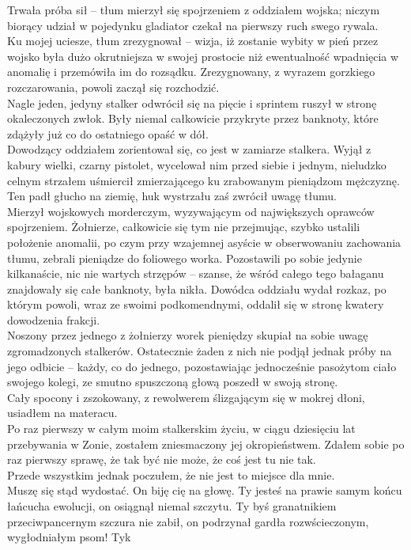 \documentclass[../MAIN.tex]{subfiles}
\begin{document}
Trwała próba sił -- tłum mierzył się spojrzeniem z oddziałem wojska; niczym biorący udział w pojedynku gladiator czekał na pierwszy ruch swego rywala.\\
Ku mojej uciesze, tłum zrezygnował -- wizja, iż zostanie wybity w pień przez wojsko była dużo okrutniejsza w swojej prostocie niż ewentualność wpadnięcia w anomalię i przemówiła im do rozsądku. Zrezygnowany, z wyrazem gorzkiego rozczarowania, powoli zaczął się rozchodzić.\\
Nagle jeden, jedyny stalker odwrócił się na pięcie i sprintem ruszył w stronę okaleczonych zwłok. Były niemal całkowicie przykryte przez banknoty, które zdążyły już co do ostatniego opaść w dół.\\
Dowodzący oddziałem zorientował się, co jest w zamiarze stalkera. Wyjął z kabury wielki, czarny pistolet, wycelował nim przed siebie i jednym, nieludzko celnym strzałem uśmiercił zmierzającego ku zrabowanym pieniądzom mężczyznę. Ten padł głucho na ziemię, huk wystrzału zaś zwrócił uwagę tłumu.\\
Mierzył wojskowych morderczym, wyzywającym od największych oprawców spojrzeniem. Żołnierze, całkowicie się tym nie przejmując, szybko ustalili położenie anomalii, po czym przy wzajemnej asyście w obserwowaniu zachowania tłumu, zebrali pieniądze do foliowego worka. Pozostawili po sobie jedynie kilkanaście, nic nie wartych strzępów -- szanse, że wśród całego tego bałaganu znajdowały się całe banknoty, była nikła. Dowódca oddziału wydał rozkaz, po którym powoli, wraz ze swoimi podkomendnymi, oddalił się w stronę kwatery dowodzenia frakcji.\\
Noszony przez jednego z żołnierzy worek pieniędzy skupiał na sobie uwagę zgromadzonych stalkerów. Ostatecznie żaden z nich nie podjął jednak próby na jego odbicie -- każdy, co do jednego, pozostawiając jednocześnie pasożytom ciało swojego kolegi, ze smutno spuszczoną głową poszedł w swoją stronę.\\
Cały spocony i zszokowany, z rewolwerem ślizgającym się w mokrej dłoni, usiadłem na materacu.\\
Po raz pierwszy w całym moim stalkerskim życiu, w ciągu dziesięciu lat przebywania w Zonie, zostałem zniesmaczony jej okropieństwem. Zdałem sobie po raz pierwszy sprawę, że tak być nie może, że coś jest tu nie tak.\\
Przede wszystkim jednak poczułem, że nie jest to miejsce dla mnie.\\
Muszę się stąd wydostać.
%
%
\sx On biję cię na głowę. Ty jesteś na prawie samym końcu łańcucha ewolucji, on osiągnął niemal szczytu. Ty byś granatnikiem przeciwpancernym szczura nie zabił, on podrzynał gardła rozwścieczonym, wygłodniałym psom! Ty\3k 
\end{document}
